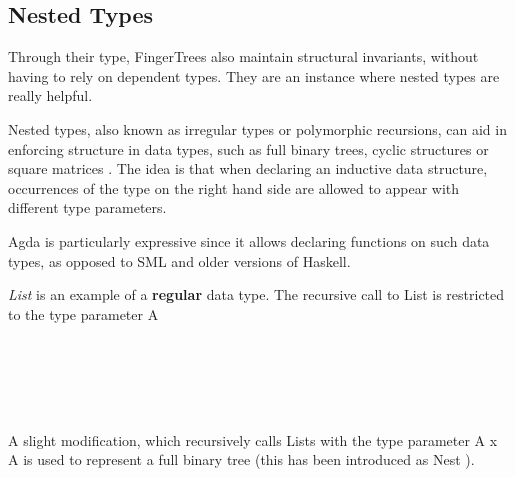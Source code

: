 \documentclass[12pt,twoside,notitlepage]{report}
\begin{document}
\subsection{Nested Types}

Through their type, FingerTrees also maintain structural invariants, without having to rely on dependent types. They are an instance where nested types are really helpful. 

Nested types\cite{nested}, also known as irregular types or polymorphic recursions, can aid in enforcing structure in data types, such as full binary trees, cyclic structures \cite{cyclic} or square matrices \cite{matrix}. The idea is that when declaring an inductive data structure, occurrences of the type on the right hand side are allowed to appear with different type parameters.

Agda is particularly expressive since it allows declaring functions on such data types, as opposed to SML and older versions of Haskell.

\textit{List} is an example of a \textbf{regular} data type. The recursive call to List is restricted to the type parameter A

\begin{code}
\\
\>  \AgdaSymbol{(} \AgdaSymbol{:} \AgdaSymbol{)} \AgdaSymbol{:}  \<%
\\
\>[0]\<[2]%
\>[2]\AgdaInductiveConstructor{[]} \AgdaSymbol{:}  \<%
\\
\>[0]\<[2]%
\>[2] \AgdaSymbol{:}       \<%
\\
\end{code}

A slight modification, which recursively calls Lists with the type parameter A x A is used to represent a full binary tree (this has been introduced as Nest \cite{nested}).

\begin{code}
\\
\>  \AgdaSymbol{(} \AgdaSymbol{:} \AgdaSymbol{)} \AgdaSymbol{:}  \<%
\\
\>[0]\<[2]%
\>[2] \AgdaSymbol{:}  \<%
\\
\>[0]\<[2]%
\>[2] \AgdaSymbol{:}    \AgdaSymbol{(}  \AgdaSymbol{)}   \<%
\\
\end{code}
\end{document}
